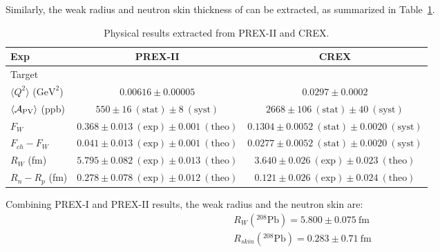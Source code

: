Similarly, the weak radius and neutron skin thickness of \Ca can be extracted,
as summarized in Table~\ref{tab:pcrex_neutron_skin}.
\begin{table}[!h]
    \centering
    \begin{tabular}{l | c c}
	\hline
	Exp	& PREX-II   & CREX  \\
	\hline
	Target	& \Pb	    & \Ca   \\
	$\langle Q^2 \rangle $ ($\mathrm{GeV}^2$)	& $ 0.00616 \pm 0.00005 $   & $0.0297 \pm 0.0002 $  \\
	$\langle \mathcal{A}_{\text{PV}} \rangle$ (ppb)   & $550 \pm 16 \ (\text{stat}) \pm 8 \ (\text{syst})$	& $2668 \pm 106 \ (\text{stat}) \pm 40 \ (\text{syst})$ \\
	$F_W$	& $0.368 \pm 0.013 \ (\text{exp}) \pm 0.001 \ (\text{theo})$    & $0.1304 \pm 0.0052 \ (\text{stat}) \pm 0.0020 \ (\text{syst})$    \\
	$F_{ch} - F_W$	& $0.041 \pm 0.013 \ (\text{exp}) \pm 0.001 \ (\text{theo})$    & $0.0277 \pm 0.0052 \ (\text{stat}) \pm 0.0020 \ (\text{syst})$    \\
	$R_W$ (fm)	& $5.795 \pm 0.082 \ (\text{exp}) \pm 0.013 \ (\text{theo})$    & $3.640 \pm 0.026 \ (\text{exp}) \pm 0.023 \ (\text{theo})$\\
	$R_n - R_p$ (fm)  & $0.278 \pm 0.078 \ (\text{exp}) \pm 0.012 \ (\text{theo})$	& $0.121 \pm 0.026 \ (\text{exp}) \pm 0.024 \ (\text{theo})$    \\
	\hline
    \end{tabular}
    \caption{Physical results extracted from PREX-II and CREX. 
    }
    \label{tab:pcrex_neutron_skin}
\end{table}

Combining PREX-I and PREX-II results, the weak radius and the neutron skin are:
\begin{equation}
    \begin{gathered}
	R_W({}^{208}\text{Pb}) = 5.800 \pm 0.075\ \mathrm{fm}  \\
	R_{skin}({}^{208}\text{Pb}) = 0.283 \pm 0.71\ \mathrm{fm}   \\
    \end{gathered}
\end{equation}
